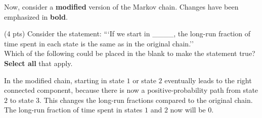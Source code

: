\documentclass[11pt]{article}
\begin{document}
\begin{prob}[(14 pts)]
\newpage

Now, consider a \textbf{modified} version of the Markov chain. Changes have been emphasized in \textbf{bold}.

\begin{center}
\end{center}

\begin{subprob}(4 pts)
Consider the statement: ```If we start in \_\_\_\_, the long-run fraction of time spent in each state is the same as in the original chain.'' \\

Which of the following could be placed in the blank to make the statement true? \textbf{Select all} that apply. \\

    



\begin{solution}
In the modified chain, starting in state $1$ or state $2$ eventually leads to the right connected component, because there is now a positive-probability path from state $2$ to state $3$. This changes the long-run fractions compared to the original chain. The long-run fraction of time spent in states $1$ and $2$ now will be $0$. \\


\end{solution}
\end{subprob}
\end{prob}
\end{document}
